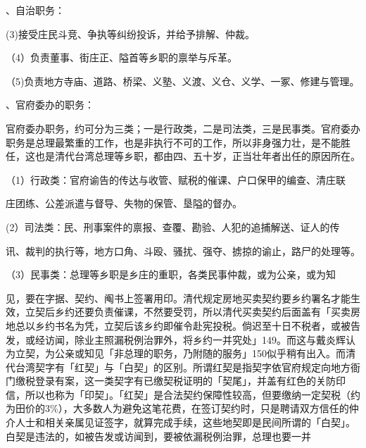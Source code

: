 


、自治职务：



(3)接受庄民斗竞、争执等纠纷投诉，并给予排解、仲裁。

（4）负责董事、街庄正、隘首等乡职的禀举与斥革。

（5)负责地方寺庙、道路、桥梁、义塾、义渡、义仓、义学、一冢、修建与管理。

\vfill
\begin{BookNotes}
\end{BookNotes}

、官府委办的职务：

官府委办职务，约可分为三类；一是行政类，二是司法类，三是民事类。官府委办职务是总理最繁重的工作，也是非执行不可的工作，所以非身强力壮，是不能胜任，这也是清代台湾总理等乡职，都由四、五十岁，正当壮年者出任的原因所在。

（1）行政类：官府谕告的传达与收管、赋税的催课、户口保甲的编查、清庄联

\begin{BookQuote}
庄团练、公差派遣与督导、失物的保管、垦隘的督办。
\end{BookQuote}

(2）司法类：民、刑事案件的禀报、查覆、勘验、人犯的追捕解送、证人的传

\begin{BookQuote}
讯、裁判的执行等，地方口角、斗殴、骚扰、强夺、掳掠的谕止，路尸的处理等。
\end{BookQuote}

（3）民事类：总理等乡职是乡庄的重职，各类民事仲裁，或为公亲，或为知

\begin{BookQuote}
见，要在字据、契约、阄书上签署用印。清代规定房地买卖契约要乡约署名才能生效，立契后乡约还要负责催课，不然要受罚，所以清代买卖契约后面盖有「买卖房地总以乡约书名为凭，立契后该乡约即催令赴宪投税。倘迟至十日不税者，或被告发，或经访闻，除业主照漏税例治罪外，将乡约一并究处」149。而这与戴炎辉认为立契，为公亲或知见「非总理的职务，乃附随的服务」150似乎稍有出入。而清代台湾契字有「红契」与「白契」的区别。所谓红契是指契字依官府规定向地方衙门缴税登录有案，这一类契字有已缴契税证明的「契尾」，并盖有红色的关防印信，所以也称为「印契」。「红契」是合法契约保障性较高，但要缴纳一定契税（约为田价的3\%），大多数人为避免这笔花费，在签订契约时，只是聘请双方信任的仲介人士和相关亲属见证签字，就算完成手续，这些地契即是民间所谓的「白契」。白契是违法的，如被告发或访闻到，要被依漏税例治罪，总理也要一并
\end{BookQuote}

